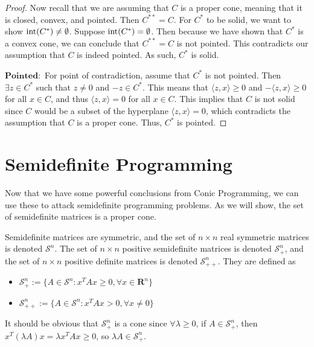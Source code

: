 \begin{proof}
		Now recall that we are assuming that $C$ is a proper cone, meaning that it is closed, convex, and pointed. Then $C^{**} = C$. For $C^*$ to be solid, we want to show $\textnormal{int}(C^*) \neq \emptyset$. Suppose $\textnormal{int}(C^*) = \emptyset$. Then because we have shown that $C^*$ is a convex cone, we can conclude that $C^{**} = C$ is not pointed. This contradicts our assumption that $C$ is indeed pointed. As such, $C^*$ is solid. 
		
		$\mathbf{Pointed: }$ For point of contradiction, assume that $C^*$ is not pointed. Then $\exists z \in C^*$ such that $z \neq 0$ and $-z \in C^*$. This means that $\langle z, x \rangle \geq 0$ and $- \langle z, x \rangle \geq 0$ for all $x \in C$, and thus $\langle z, x \rangle = 0$ for all $x \in C$. This implies that $C$ is not solid since $C$ would be a subset of the hyperplane $\langle z, x \rangle = 0$, which contradicts the assumption that $C$ is a proper cone. Thus, $C^*$ is pointed. 
	\end{proof}
	
	\section{Semidefinite Programming}
	
	Now that we have some powerful conclusions from Conic Programming, we can use these to attack semidefinite programming problems. As we will show, the set of semidefinite matrices is a proper cone. 
	
	Semidefinite matrices are symmetric, and the set of $n \times n$ real symmetric matrices is denoted $\mathcal{S}^n$. 
	The set of $n \times n$ positive semidefinite matrices is denoted $\mathcal{S}^n_+$, and the set of $n \times n$ positive definite matrices is denoted $\mathcal{S}^n_{++}$. They are defined as
	 
	 \begin{itemize}
	 	\item $\mathcal{S}^n_+ := \{A \in \mathcal{S}^n : x^T A x \geq 0, \forall x \in \mathbf{R}^n\}$ 
	 	
	 	\item $\mathcal{S}^n_{++} := \{A \in \mathcal{S}^n : x^T A x > 0, \forall x \neq 0\}$
	 \end{itemize}
	 
	 It should be obvious that $\mathcal{S}^n_{+}$ is a cone since $\forall \lambda \geq 0$, if $A \in \mathcal{S}^n_+$, then $x^T(\lambda A)x = \lambda x^T A x \geq 0$, so $\lambda A \in \mathcal{S}^n_+$. 
	 
